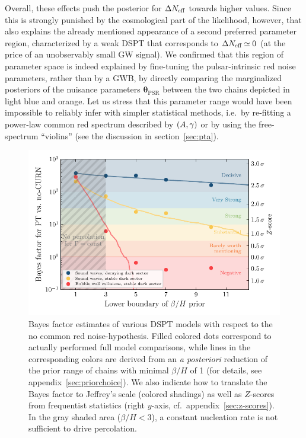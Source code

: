Overall, these effects push the posterior for $\Delta N_\text{eff} $ towards higher values. Since this is strongly punished by the cosmological part of the likelihood, however, that also explains the already mentioned appearance of a second preferred parameter region, characterized by a weak \ac{DSPT} that corresponds to $\Delta N_\text{eff}  \simeq 0$ (at the price of an unobservably small \ac{GW} signal).  We confirmed that this region of parameter space is indeed explained by fine-tuning the pulsar-intrinsic red noise parameters, rather than by a \ac{GWB}, by directly comparing the marginalized posteriors of the nuisance parameters $\bm{\theta}_\text{PSR}$ between the two chains depicted in \textcolor{DESYcyan}{light blue} and \textcolor{DESYorange}{orange}. Let us stress that this parameter range would have been impossible to reliably infer with simpler statistical methods, i.e.~by re-fitting a power-law common red spectrum described by $\left( A, \gamma \right)$ or by using the free-spectrum ``violins'' (see the discussion in section~\ref{sec:pta}).

\begin{figure}[t]
	\centering
	\includegraphics[width = \textwidth]{thesisplots/ptbbn/ptbbn_4}
	\caption{Bayes factor estimates of various \ac{DSPT} models with respect to the no common red noise-hypothesis. Filled colored dots correspond to actually performed full model comparisons, while lines in the corresponding colors are derived from an \textit{a posteriori} reduction of the prior range of chains with minimal $\beta/H$ of 1 (for details, see appendix~\ref{sec:priorchoice}). We also indicate how to translate the Bayes factor to  Jeffrey's scale (colored shadings) as well as $Z$-scores from frequentist statistics (right $y$-axis, cf.~appendix~\ref{sec:z-scores}). In the gray shaded area ($\beta/H < 3$), a constant nucleation rate is not sufficient to drive percolation.}
	\label{fig:BFs}
\end{figure}

